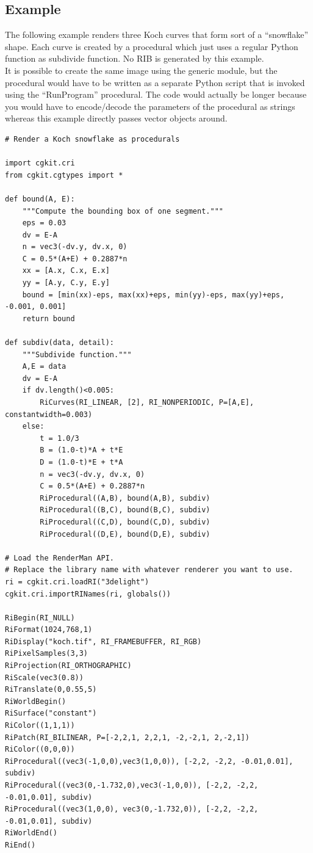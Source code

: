 \subsection{Example}

The following example renders three Koch curves that form sort of a ``snowflake''
shape. Each curve is created by a procedural which just uses a regular Python
function as subdivide function. No RIB is generated by this example.\\
It is possible to create the same image using the generic  module,
but the procedural would have to be written as a separate Python script that is
invoked using the ``RunProgram'' procedural. The code would actually be longer
because you would have to encode/decode the parameters of the procedural as
strings whereas this example directly passes vector objects around.

\begin{verbatim}
# Render a Koch snowflake as procedurals

import cgkit.cri
from cgkit.cgtypes import *

def bound(A, E):
    """Compute the bounding box of one segment."""
    eps = 0.03
    dv = E-A
    n = vec3(-dv.y, dv.x, 0)
    C = 0.5*(A+E) + 0.2887*n
    xx = [A.x, C.x, E.x]
    yy = [A.y, C.y, E.y]
    bound = [min(xx)-eps, max(xx)+eps, min(yy)-eps, max(yy)+eps, -0.001, 0.001]
    return bound

def subdiv(data, detail):
    """Subdivide function."""
    A,E = data
    dv = E-A
    if dv.length()<0.005:
        RiCurves(RI_LINEAR, [2], RI_NONPERIODIC, P=[A,E], constantwidth=0.003)
    else:
        t = 1.0/3
        B = (1.0-t)*A + t*E
        D = (1.0-t)*E + t*A
        n = vec3(-dv.y, dv.x, 0)
        C = 0.5*(A+E) + 0.2887*n
        RiProcedural((A,B), bound(A,B), subdiv)
        RiProcedural((B,C), bound(B,C), subdiv)
        RiProcedural((C,D), bound(C,D), subdiv)
        RiProcedural((D,E), bound(D,E), subdiv)

# Load the RenderMan API.
# Replace the library name with whatever renderer you want to use.
ri = cgkit.cri.loadRI("3delight")
cgkit.cri.importRINames(ri, globals())

RiBegin(RI_NULL)
RiFormat(1024,768,1)
RiDisplay("koch.tif", RI_FRAMEBUFFER, RI_RGB)
RiPixelSamples(3,3)
RiProjection(RI_ORTHOGRAPHIC)
RiScale(vec3(0.8))
RiTranslate(0,0.55,5)
RiWorldBegin()
RiSurface("constant")
RiColor((1,1,1))
RiPatch(RI_BILINEAR, P=[-2,2,1, 2,2,1, -2,-2,1, 2,-2,1])
RiColor((0,0,0))
RiProcedural((vec3(-1,0,0),vec3(1,0,0)), [-2,2, -2,2, -0.01,0.01], subdiv)
RiProcedural((vec3(0,-1.732,0),vec3(-1,0,0)), [-2,2, -2,2, -0.01,0.01], subdiv)
RiProcedural((vec3(1,0,0), vec3(0,-1.732,0)), [-2,2, -2,2, -0.01,0.01], subdiv)
RiWorldEnd()
RiEnd()
\end{verbatim}

